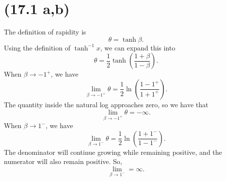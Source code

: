 \section{(17.1 a,b)}

\begin{parts}
    \item The definition of rapidity is
        \begin{equation}
            \theta = \tanh \beta.
        \end{equation}
        Using the definition of $\tanh^{-1} x$, we can expand this into
        \begin{equation*}
            \theta = \frac{1}{2}\tanh \left(\frac{1+\beta}{1-\beta}\right).
        \end{equation*}
        When $\beta \rightarrow -1^+$, we have
        \begin{equation*}
            \lim_{\beta\rightarrow -1^+} \theta = \frac{1}{2}\ln \left(\frac{1-1^+}{1+1^+}\right).
        \end{equation*}
        The quantity inside the natural log approaches zero, so we have that
        \begin{equation*}
            \boxed{\lim_{\beta \rightarrow -1^+} \theta = -\infty.}
        \end{equation*}
        When $\beta \rightarrow 1^-$, we have
        \begin{equation*}
            \lim_{\beta \rightarrow 1^-} \theta = \frac{1}{2}\ln\left(\frac{1+1^-}{1-1^-}\right).
        \end{equation*}
        The denominator will continue growing while remaining positive, and the numerator will also remain positive. So,
        \begin{equation*}
            \boxed{\lim_{\beta \rightarrow 1^-} = \infty.}
        \end{equation*}


\end{parts}
